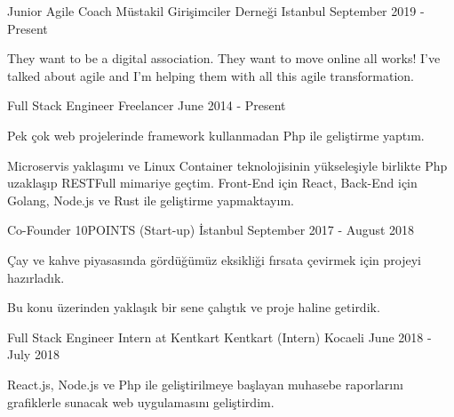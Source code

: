 \begin{cventries}

    \cventry
    {Junior Agile Coach}
    {Müstakil Girişimciler Derneği}
    {Istanbul}
    {September 2019 - Present}
    {
        \begin{cvitems}
            \item {They want to be a digital association. They want to move online all works! I've talked about agile and I'm helping them with all this agile transformation.}
        \end{cvitems}
    }
    
  \cventry
    {Full Stack Engineer}
    {Freelancer}
    {}
    {June 2014 - Present}
    {
      \begin{cvitems}
        \item {Pek çok web projelerinde framework kullanmadan Php ile geliştirme yaptım.}
        \item {Microservis yaklaşımı ve Linux Container teknolojisinin yükseleşiyle birlikte Php uzaklaşıp RESTFull mimariye geçtim. Front-End için React, Back-End için Golang, Node.js ve Rust ile geliştirme yapmaktayım.}
      \end{cvitems}
    }
    
  \cventry
    {Co-Founder}
    {10POINTS (Start-up)}
    {İstanbul}
    {September 2017 - August 2018}
    {
      \begin{cvitems}
        \item {Çay ve kahve piyasasında gördüğümüz eksikliği fırsata çevirmek için projeyi hazırladık.}
        \item {Bu konu üzerinden yaklaşık bir sene çalıştık ve proje haline getirdik.}
      \end{cvitems}
    }
    
  \cventry
    {Full Stack Engineer Intern at Kentkart}
    {Kentkart (Intern)}
    {Kocaeli}
    {June 2018 - July 2018}
    {
      \begin{cvitems}
        \item {React.js, Node.js ve Php ile geliştirilmeye başlayan muhasebe raporlarını grafiklerle sunacak web uygulamasını geliştirdim.}
      \end{cvitems}
    }
    

\end{cventries}
